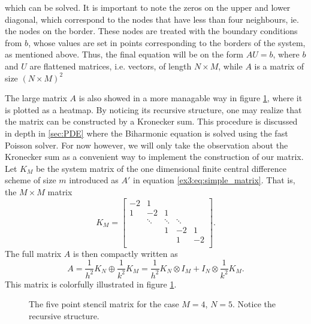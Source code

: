 which can be solved.
It is important to note the zeros on the upper and lower diagonal, which correspond to the nodes that have less than four neighbours, ie. the nodes on the border.
These nodes are treated with the boundary conditions from $b$, whose values are set in points corresponding to the borders of the system, as mentioned above.
Thus, the final equation will be on the form $AU = b$, where $b$ and $U$ are flattened matrices, i.e. vectors, of length $N \times M$, while $A$ is a matrix of size $(N \times M)^2$

The large matrix $A$ is also showed in a more managable way in figure \ref{fig:laplace:stencil}, where it is plotted as a heatmap.
By noticing its recursive structure, one may realize that the matrix can be constructed by a Kronecker sum.
This procedure is discussed in depth in \ref{sec:PDE} where the Biharmonic equation is solved using the fast Poisson solver.
For now however, we will only take the observation about the Kronecker sum as a convenient way to implement the construction of our matrix.
Let $K_M$ be the system matrix of the one dimensional finite central difference scheme of size $m$ introduced as $A'$ in equation \eqref{ex3:eq:simple_matrix}.
That is, the $M\times M$ matrix
$$
K_M =
\begin{bmatrix}
  -2& 1 \\
  1 & -2 & 1 &   \\
  & \ddots & \ddots & \ddots & \\
  &   & 1 & -2 & 1 \\
  &   &  & 1 & -2 \\
\end{bmatrix}.
$$
The full matrix $A$ is then compactly written as
\begin{equation}
  A =
  \frac{1}{h^2} K_N \oplus \frac{1}{k^2} K_M
  = \frac{1}{h^2} K_N \otimes I_M
  + I_N \otimes \frac{1}{k^2} K_M.
\end{equation}
This matrix is colorfully illustrated in figure \ref{fig:laplace:stencil}.

\begin{figure}[btp]
  \centering

  \caption{The five point stencil matrix for the case $M=4$, $N=5$. Notice the recursive structure.}
  \label{fig:laplace:stencil}
\end{figure}

